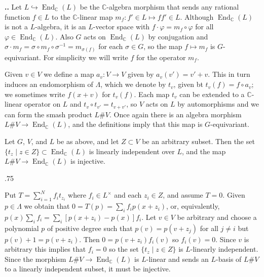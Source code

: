 \documentclass[11pt,fleqn]{amsart}
\makeatletter
\renewcommand\thesection{\arabic{section}}
\renewcommand\proofname{Proof}
\renewenvironment{proof}[1][\textit{\proofname}]{\par
 \pushQED{\qed}%
 \normalfont \topsep.75\paraskip\relax
 \trivlist
 \item[\hskip\labelsep
 \itshape
 #1\@addpunct{.}]\ignorespaces
}{%
 \popQED\endtrivlist\@endpefalse
}
\newcounter{para}[section]
\renewcommand\thepara{\thesection.\arabic{para}}
\def\paragraph{%
 \noindent
 \refstepcounter{para}%
 \textbf{\thepara.}\hspace{1ex}%
}
\newcommand\CC{\mathbb C}
\renewcommand\to{\longrightarrow}
\renewcommand\phi{\varphi}
\DeclareMathOperator\End{End}
\makeatother
\begin{document}
\paragraph Let $L \hookrightarrow \End_\CC(L)$ be the $\CC$-algebra morphism 
that sends any rational function $f \in L$ to the $\CC$-linear map $m_f: f' 
\in L \mapsto ff' \in L$. Although $\End_\CC(L)$ is not a $L$-algebra, it is
an $L$-vector space with $f \cdot \phi = m_f \circ \phi$ for all
$\phi \in \End_\CC(L)$. Also $G$ acts on $\End_\CC(L)$ by conjugation and 
$\sigma \cdot m_f = \sigma \circ m_f \circ \sigma^{-1} = m_{\sigma(f)}$ for 
each $\sigma \in G$, so the map $f \mapsto m_f$ is $G$-equivariant. For 
simplicity we will write $f$ for the operator $m_f$.

Given $v \in V$ we define a map $a_v: V \to V$ given by $a_v(v') = v'+v$. This
in turn induces an endomorphism of $\Lambda$, which we denote by $t_v$, given 
bt $t_v(f) = f \circ a_{v}$; we sometimes write $f(x+v)$ for $t_v(f)$. Each 
map $t_v$ can be extended to a $\CC$-linear operator on $L$ and
$t_v \circ t_{v'} = t_{v+v'}$, so $V$ acts on $L$ by automorphisms and we can 
form the smash product $L\# V$. Once again there is an algebra morphism $L \# V
\rightarrow \End_\CC(L)$, and the definitions imply that this map is 
$G$-equivariant. 

\begin{Lemma}
\label{L:translation-lemma}
Let $G$, $V$, and $L$ be as above, and let $Z \subset V$ be an arbitrary 
subset. Then the set $\{t_z \mid z \in Z\} \subset \End_\CC(L)$ is linearly
independent over $L$, and the map $L \# V \to \End_\CC(L)$ is injective.
\end{Lemma}
\begin{proof}
Put $T = \sum_{i=1}^N f_i t_{z_i}$ where $f_i \in L^\times$ and each $z_i 
\in Z$, and assume $T = 0$. Given $p \in \Lambda$ we obtain that $0 = T(p) = 
\sum_i f_i p(x+z_i)$, or, equivalently, $p(x) \sum_i f_i = \sum_i [p(x+z_i)- 
p(x)] f_i$. Let $v \in V$ be arbitrary and choose a polynomial $p$ of positive 
degree such that $p(v) = p(v + z_j)$ for all $j \neq i$ but $ p(v) + 1 = 
p(v + z_i)$. Then $0 = p(v+z_i) f_i(v)$ so $f_i(v) = 0$. Since $v$ is 
arbitrary this implies that $f_i = 0$ so the set $\{t_z \mid z \in Z\}$ is 
$L$-linearly independent. Since the morphism $L \# V \to \End_\CC(L)$ is 
$L$-linear and sends an $L$-basis of $L \# V$ to a linearly independent subset,
it must be injective.
\end{proof}
\end{document}
